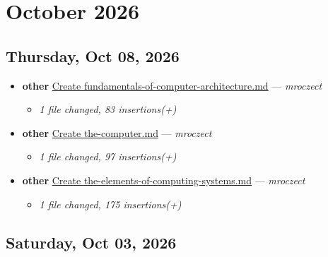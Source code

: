 \section*{October 2026}

\subsection*{Thursday, Oct 08, 2026}

\begin{itemize}[leftmargin=1.5em]
  \item \textbf{other} \href{https://github.com/mroczect/mroczect.github.io/commit/2a2147ceb47be642cf8ab3118d33714317c74c98}{Create fundamentals-of-computer-architecture.md} --- \textit{mroczect}
  \begin{itemize}[leftmargin=1.5em]
    \item \small\textit{1 file changed, 83 insertions(+)}
  \end{itemize}
  \item \textbf{other} \href{https://github.com/mroczect/mroczect.github.io/commit/393c5757ea2d5f482cb360ac141969164f4e745b}{Create the-computer.md} --- \textit{mroczect}
  \begin{itemize}[leftmargin=1.5em]
    \item \small\textit{1 file changed, 97 insertions(+)}
  \end{itemize}
  \item \textbf{other} \href{https://github.com/mroczect/mroczect.github.io/commit/e9884ced749d4e5cc725b67b3a222222098c8d59}{Create the-elements-of-computing-systems.md} --- \textit{mroczect}
  \begin{itemize}[leftmargin=1.5em]
    \item \small\textit{1 file changed, 175 insertions(+)}
  \end{itemize}
\end{itemize}

\subsection*{Saturday, Oct 03, 2026}

